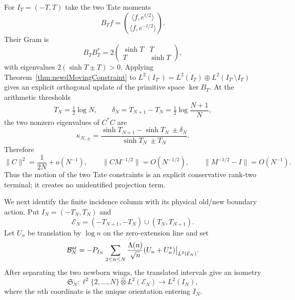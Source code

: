 \documentclass[11pt]{amsart}
\theoremstyle{definition}
\theoremstyle{remark}
\begin{document}
For $I_T=(-T,T)$ take the two Tate moments
\begin{equation}\label{eq:newdTateMomentMap}
 B_Tf=
 \binom{\langle f,e^{t/2}\rangle}{\langle f,e^{-t/2}\rangle}.
\end{equation}
Their Gram is
\begin{equation}\label{eq:newdTateGram}
 B_TB_T^*=2
 \begin{pmatrix}\sinh T&T\\T&\sinh T\end{pmatrix},
\end{equation}
with eigenvalues $2(\sinh T\pm T)>0$.  Applying
Theorem~\ref{thm:newdMovingConstraint} to
$L^2(I_{T'})=L^2(I_T)\oplus L^2(I_{T'}\setminus I_T)$ gives an explicit
orthogonal update of the primitive space $\ker B_T$.  At the arithmetic
thresholds
\[
 T_N=\tfrac12\log N,
 \qquad
 \delta_N=T_{N+1}-T_N=\tfrac12\log\frac{N+1}{N},
\]
the two nonzero eigenvalues of $C^*C$ are
\begin{equation}\label{eq:newdTateReturnEigenvalues}
 \kappa_{N,\pm}=
 \frac{\sinh T_{N+1}-\sinh T_N\ \pm\delta_N}
      {\sinh T_N\ \pm T_N}.
\end{equation}
Therefore
\begin{equation}\label{eq:newdTateReturnDecay}
 \|C\|^2=\frac1{2N}+o(N^{-1}),
 \qquad
 \|CM^{-1/2}\|=O(N^{-1/2}),
 \qquad
 \|M^{-1/2}-I\|=O(N^{-1}).
\end{equation}
Thus the motion of the two Tate constraints is an explicit conservative
rank-two terminal; it creates no unidentified projection term.

We next identify the finite incidence column with its physical
old/new boundary action.  Put $I_N=(-T_N,T_N)$ and
\[
 \mathcal E_N=
 (-T_{N+1},-T_N)\cup(T_N,T_{N+1}).
\]
Let $U_n$ be translation by $\log n$ on the zero-extension line and set
\begin{equation}\label{eq:newdPhysicalIncidence}
 \mathcal B_N^{\rm ar}
 =-P_{I_N}\sum_{2\leq n\leq N}
       \frac{\Lambda(n)}{\sqrt n}(U_n+U_n^*)
       \big|_{L^2(\mathcal E_N)}.
\end{equation}
After separating the two newborn wings, the translated intervals give an
isometry
\[
 \mathfrak S_N:
 \ell^2\{2,\ldots,N\}\widehat\otimes L^2(\mathcal E_N)
 \longrightarrow L^2(I_N),
\]
where the $n$th coordinate is the unique orientation entering $I_N$.
\end{document}
